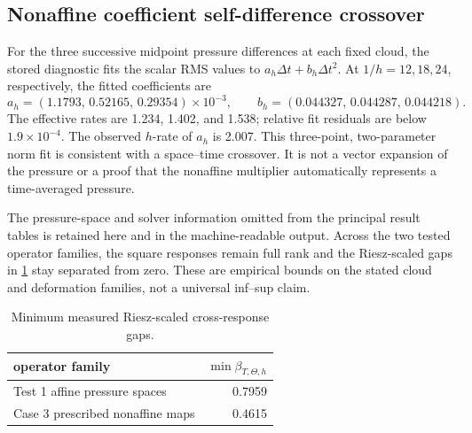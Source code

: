 \documentclass[11pt]{article}
\theoremstyle{plain}
\theoremstyle{definition}
\theoremstyle{remark}
\newcommand{\dt}{\Delta t}
\newcommand{\Th}{\Theta}
\begin{document}
\subsection{Nonaffine coefficient self-difference crossover}
\label{sec:coefficient_mixed_audit}

For the three successive midpoint pressure differences at each fixed cloud,
the stored diagnostic fits the scalar RMS values to
$a_h\dt+b_h\dt^2$.  At $1/h=12,18,24$, respectively, the fitted coefficients
are
\[
 a_h=(1.1793,\,0.52165,\,0.29354)\times10^{-3},\qquad
 b_h=(0.044327,\,0.044287,\,0.044218).
\]
The effective rates are 1.234, 1.402, and 1.538; relative fit residuals are
below $1.9\times10^{-4}$.  The observed $h$-rate of $a_h$ is 2.007.
This three-point, two-parameter norm fit is consistent with a space--time
crossover.  It is not a vector expansion of the pressure or a proof that the
nonaffine multiplier automatically represents a time-averaged pressure.

\label{app:operator_audits}

The pressure-space and solver information omitted from the principal result
tables is retained here and in the machine-readable output.  Across the two
tested operator families, the square responses remain full rank and the
Riesz-scaled gaps in \cref{tab:supp_riesz_gap_summary} stay separated from
zero.  These are empirical bounds on the stated cloud and deformation
families, not a universal inf--sup claim.

\begin{table}[ht]
\centering
\caption{Minimum measured Riesz-scaled cross-response gaps.}
\label{tab:supp_riesz_gap_summary}
\begin{tabular}{lr}
\toprule
operator family & $\min\beta_{T,\Th,h}$ \\
\midrule
Test 1 affine pressure spaces & 0.7959 \\
Case 3 prescribed nonaffine maps & 0.4615 \\
\bottomrule
\end{tabular}
\end{table}
\end{document}

